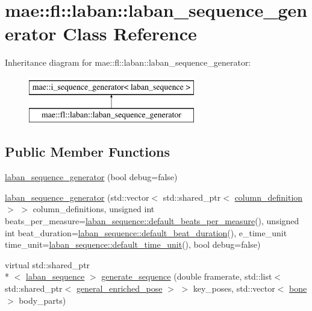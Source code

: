 \hypertarget{classmae_1_1fl_1_1laban_1_1laban__sequence__generator}{\section{mae\-:\-:fl\-:\-:laban\-:\-:laban\-\_\-sequence\-\_\-generator Class Reference}
\label{classmae_1_1fl_1_1laban_1_1laban__sequence__generator}
}
Inheritance diagram for mae\-:\-:fl\-:\-:laban\-:\-:laban\-\_\-sequence\-\_\-generator\-:\begin{figure}[H]
\begin{center}
\leavevmode
\includegraphics[height=2.000000cm]{classmae_1_1fl_1_1laban_1_1laban__sequence__generator}
\end{center}
\end{figure}
\subsection*{Public Member Functions}
\begin{DoxyCompactItemize}
\item 
\hyperlink{classmae_1_1fl_1_1laban_1_1laban__sequence__generator_a0a792b68242d577bf3a8a627aeeaf43d}{laban\-\_\-sequence\-\_\-generator} (bool debug=false)
\item 
\hyperlink{classmae_1_1fl_1_1laban_1_1laban__sequence__generator_a69a1595e54b58f0051bc9ac8e4c99f82}{laban\-\_\-sequence\-\_\-generator} (std\-::vector$<$ std\-::shared\-\_\-ptr$<$ \hyperlink{classmae_1_1fl_1_1laban_1_1column__definition}{column\-\_\-definition} $>$ $>$ column\-\_\-definitions, unsigned int beats\-\_\-per\-\_\-measure=\hyperlink{classmae_1_1fl_1_1laban_1_1laban__sequence_a2e64362d5cfeb89eb8545cb064e63170}{laban\-\_\-sequence\-::default\-\_\-beats\-\_\-per\-\_\-measure}(), unsigned int beat\-\_\-duration=\hyperlink{classmae_1_1fl_1_1laban_1_1laban__sequence_ac7bf04cdac0c3aed6b8ee4a887e561d9}{laban\-\_\-sequence\-::default\-\_\-beat\-\_\-duration}(), e\-\_\-time\-\_\-unit time\-\_\-unit=\hyperlink{classmae_1_1fl_1_1laban_1_1laban__sequence_ada28215d43d85e983fe6129e9816eed2}{laban\-\_\-sequence\-::default\-\_\-time\-\_\-unit}(), bool debug=false)
\item 
virtual std\-::shared\-\_\-ptr\\*
$<$ \hyperlink{classmae_1_1fl_1_1laban_1_1laban__sequence}{laban\-\_\-sequence} $>$ \hyperlink{classmae_1_1fl_1_1laban_1_1laban__sequence__generator_a6311b99a7bf78c2d9779d601ad88353e}{generate\-\_\-sequence} (double framerate, std\-::list$<$ std\-::shared\-\_\-ptr$<$ \hyperlink{classmae_1_1general__enriched__pose}{general\-\_\-enriched\-\_\-pose} $>$ $>$ key\-\_\-poses, std\-::vector$<$ \hyperlink{classmae_1_1bone}{bone} $>$ body\-\_\-parts)
\end{DoxyCompactItemize}


